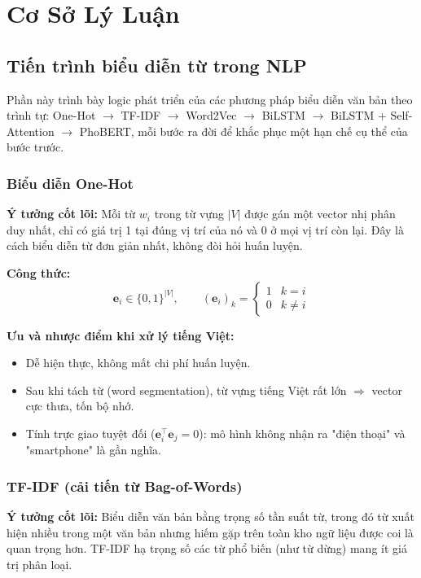 \documentclass[12pt,a4paper]{article}
\begin{document}
\newpage
\section{Cơ Sở Lý Luận}\label{sec:chuong2}

\subsection{Tiến trình biểu diễn từ trong NLP}\label{sec:tien_trinh_bieu_dien_tu}
Phần này trình bày logic phát triển của các phương pháp biểu diễn văn bản theo trình tự: One-Hot $\rightarrow$ TF-IDF $\rightarrow$ Word2Vec $\rightarrow$ BiLSTM $\rightarrow$ BiLSTM + Self-Attention $\rightarrow$ PhoBERT, mỗi bước ra đời để khắc phục một hạn chế cụ thể của bước trước.

\subsubsection{Biểu diễn One-Hot}\label{sec:one_hot}
\textbf{Ý tưởng cốt lõi:} Mỗi từ $w_i$ trong từ vựng $|V|$ được gán một vector nhị phân duy nhất, chỉ có giá trị 1 tại đúng vị trí của nó và 0 ở mọi vị trí còn lại. Đây là cách biểu diễn từ đơn giản nhất, không đòi hỏi huấn luyện.

\textbf{Công thức:}
\begin{equation}
    \mathbf{e}_i \in \{0,1\}^{|V|}, \qquad (\mathbf{e}_i)_k = \begin{cases} 1 & k = i \\ 0 & k \neq i \end{cases}
\end{equation}

\textbf{Ưu và nhược điểm khi xử lý tiếng Việt:}
\begin{itemize}[leftmargin=1.0cm, itemsep=2pt]
    \item[+] Dễ hiện thực, không mất chi phí huấn luyện.
    \item[--] Sau khi tách từ (word segmentation), từ vựng tiếng Việt rất lớn $\Rightarrow$ vector cực thưa, tốn bộ nhớ.
    \item[--] Tính trực giao tuyệt đối ($\mathbf{e}_i^\top \mathbf{e}_j = 0$): mô hình không nhận ra "điện thoại" và "smartphone" là gần nghĩa.
\end{itemize}

\subsubsection{TF-IDF (cải tiến từ Bag-of-Words)}\label{sec:bow_tfidf}
\textbf{Ý tưởng cốt lõi:} Biểu diễn văn bản bằng trọng số tần suất từ, trong đó từ xuất hiện nhiều trong một văn bản nhưng hiếm gặp trên toàn kho ngữ liệu được coi là quan trọng hơn. TF-IDF hạ trọng số các từ phổ biến (như từ dừng) mang ít giá trị phân loại.
\end{document}
